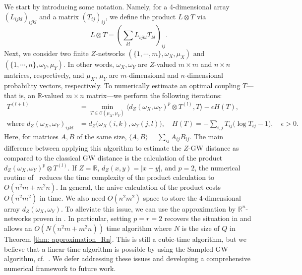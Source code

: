 \documentclass[twoside,11pt]{article}
\theoremstyle{definition}
\begin{document}
We start by introducing some notation. Namely, for a 4-dimensional array $(L_{ijkl})_{ijkl}$ and a matrix $(T_{ij})_{ij}$,  we define the product $L\otimes T$ via
\begin{equation}
    L \otimes T = \left(\sum_{kl}L_{ijkl}T_{kl}\right)_{ij}.
\end{equation}
Next, we consider two finite $Z$-networks $(\{1,\cdots, m\},\omega_X,\mu_X)$ and $(\{1,\cdots, n\},\omega_Y,\mu_Y)$. In other words, $\omega_X ,\omega_Y$ are $Z$-valued $m\times m$ and $n\times n$ matrices, respectively, and $\mu_X$, $\mu_Y$ are $m$-dimensional and $n$-dimensional probability vectors,  respectively.
To numerically estimate an optimal coupling $T$---that is, an $\mathbb{R}$-valued $m\times n$ matrix---we perform the following iterations:
\begin{align}
T^{(l+1)} &= \min_{T\in \mathcal{C}(\mu_X,\mu_Y)}
\langle d_Z(\omega_X,\omega_Y)^p\otimes T^{(l)}, T\rangle - \epsilon H(T),\\
\text{where } d_Z(\omega_X,\omega_Y)_{ijkl} &= d_Z\big(\omega_X(i,k), \omega_Y(j,l)\big), \quad
H(T) = -\sum_{i,j} T_{ij}\big(\log T_{ij}-1\big), \quad \epsilon>0 .
\end{align}
Here, for matrices $A,B$ of the same size, $\langle A,B\rangle = \sum_{ij}A_{ij}B_{ij}$. The main difference between applying this algorithm to estimate the $Z$-GW distance as compared to the classical GW distance is the calculation of the product $d_Z(\omega_X,\omega_Y)^p\otimes T^{(l)}$. If $Z=\mathbb{R}$, $d_Z(x,y)=|x-y|$, and $p=2$, the numerical routine of~\cite{peyre2016gromov} reduces the time complexity of the product calculation to $O(n^2m+m^2n)$. In general, the naive calculation of the product costs $O(n^2m^2)$ in time. We also need $O(n^2m^2)$ space to store the 4-dimensional array $d_Z(\omega_X,\omega_Y)$. To alleviate this issue, we can use the approximation by $\mathbb{R}^n$-networks proven in . In particular, setting $p=r=2$ recovers the situation in \cite{peyre2016gromov} and allows an $O(N(n^2m+m^2n))$ time algorithm where $N$ is the size of $Q$ in Theorem \ref{thm: approximation_Rn}. This is still a cubic-time algorithm, but we believe that a linear-time algorithm is possible by using the Sampled GW algorithm, cf.~\cite{Kerdoncuff2021SampledGW}. We defer addressing these issues and developing a comprehensive numerical framework to future work.
\end{document}
